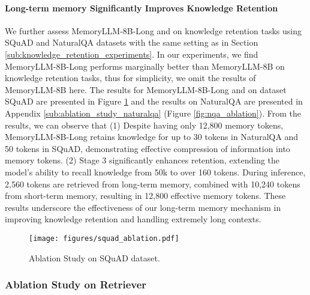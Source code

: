 \paragraph{Long-term memory Significantly Improves Knowledge Retention}
We further assess MemoryLLM-8B-Long and \ours on knowledge retention tasks using SQuAD and NaturalQA datasets with the same setting as in Section \ref{sub:knowledge_retention_experiments}. 
In our experiments, we find MemoryLLM-8B-Long performs marginally better than MemoryLLM-8B on knowledge retention tasks, thus for simplicity, we omit the results of MemoryLLM-8B here.
The results for MemoryLLM-8B-Long and \ours on dataset SQuAD are presented in Figure \ref{fig:squad_ablation} and the results on NaturalQA are presented in Appendix \ref{sub:ablation_study_naturalqa} (Figure \ref{fig:nqa_ablation}). 
From the results, we can observe that (1) Despite having only 12,800 memory tokens, MemoryLLM-8B-Long retains knowledge for up to 30 tokens in NaturalQA and 50 tokens in SQuAD, demonstrating effective compression of information into memory tokens. (2) Stage 3 significantly enhances retention, extending the model's ability to recall knowledge from 50k to over 160 tokens. During inference, 2,560 tokens are retrieved from long-term memory, combined with 10,240 tokens from short-term memory, resulting in 12,800 effective memory tokens. These results underscore the effectiveness of our long-term memory mechanism in improving knowledge retention and handling extremely long contexts. 


\begin{figure}[t]
    \centering
    \texttt{[image: figures/squad\_ablation.pdf]}
    \vspace{-15pt}
    \caption{Ablation Study on SQuAD dataset.}
    \label{fig:squad_ablation}
    \vspace{-15pt}
\end{figure}



\vspace{-5pt}
\subsubsection{Ablation Study on Retriever}
\vspace{-5pt}

